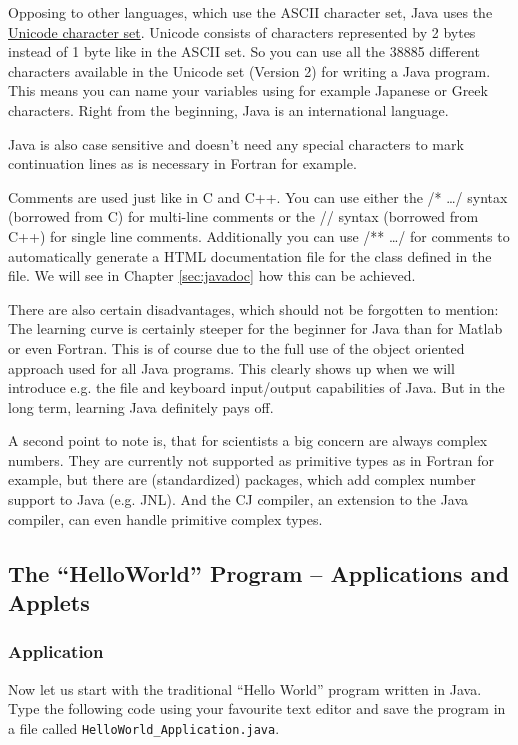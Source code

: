 Opposing to other languages, which use the ASCII character set, Java
uses the  \href{http://unicode.org}{Unicode character set}.
Unicode consists of characters represented
by 2 bytes instead of 1 byte like in the ASCII set. So you can use 
all the 38885 different
characters available in the Unicode set (Version 2) for writing a Java program.
This means you can name your variables using for example Japanese or Greek
characters. Right from the beginning, Java is an international language.

Java is also case sensitive and doesn't need any special characters
to mark continuation lines as is necessary in Fortran for example.

Comments are used just like in C and C++.
You can use either the /* \ldots */ syntax (borrowed from C) for
multi-line comments or the // syntax (borrowed from C++) for single
line comments. Additionally you can use /** \ldots */ for comments
to automatically generate a HTML documentation file for the class
defined in the file. We will see in Chapter \ref{sec:javadoc} 
how this can be achieved.
 
There are also certain disadvantages, which should not be forgotten
to mention: The learning curve is certainly steeper for the beginner
for Java than for Matlab or even Fortran. This is of course due
to the full use of the object oriented approach used for all Java
programs. This clearly shows up when we will introduce e.g. the
file and keyboard input/output capabilities of Java.
But in the long term, learning Java definitely pays off. 

A second point to note is, that for scientists a big concern are always
complex numbers. They are currently not supported as primitive types as 
in Fortran for example, but there are (standardized) packages, which
add complex number support to Java (e.g. JNL). And the CJ compiler,
an extension to the Java compiler, can even handle primitive complex types.


\subsection{The ``HelloWorld'' Program -- Applications and Applets}
\label{sec:HelloWorld}

\subsubsection{Application}

Now let us start with the traditional ``Hello World'' program written
in Java. Type the following code using your favourite text editor 
and save the program in a file called \verb|HelloWorld_Application.java|.


